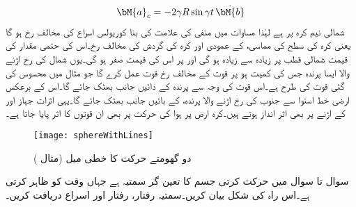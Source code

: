 \begin{align}\label{مساوات_الاحصاء_دو_گردش_ث}
\bM{a}_c=-2\gamma R\sin \gamma t \,\dot{\bM{b}}
\end{align}
شمالی نیم کرہ پر  ہے لہٰذا مساوات  میں منفی کی علامت کی بنا کوریولس اسراع  کی مخالف رخ ہو گا یعنی کرہ کی سطح کی مماسی،   کے عمودی اور کرہ کی گردش کی مخالف رخ۔اس کی حتمی مقدار  کی قیمت شمالی قطب پر زیادہ سے زیادہ ہو گی اور  پر اس کی قیمت صفر ہو گی۔یوں شمال کی رخ اڑنے والا ایسا  پرندہ  جس کی کمیت  ہو پر قوت   کے مخالف رخ قوت  عمل کرے گا جو مثال   میں محسوس کی گئی قوت کی طرح ہے۔اس قوت کی وجہ سے پرندہ  کے دائیں جانب بھٹک جائے گا۔اس کے برعکس ارضی خط استوا سے جنوب کی رخ اڑنے والا  پرندہ،  کے بائیں جانب بھٹک جائے گا۔یہی اثرات جہاز اور  کے اڑنے پر بھی اثر انداز ہوتے ہیں۔کرہ ارض پر ہوا کی حرکت پر بھی ان قوتوں کا اثر پایا جاتا ہے۔
\begin{figure}
\centering
\texttt{[image: sphereWithLines]}
\caption{دو گھومتے حرکت کا خطی میل (مثال )}
\label{شکل_مثال_الاحصاء_دو_گردش_کی_میل}
\end{figure}

سوال  تا سوال  میں حرکت کرتی جسم کا تعین گر سمتیہ  ہے جہاں  وقت کو ظاہر کرتی ہے۔اس راہ کی شکل بیان کریں۔سمتیہ رفتار، رفتار اور اسراع دریافت کریں۔

